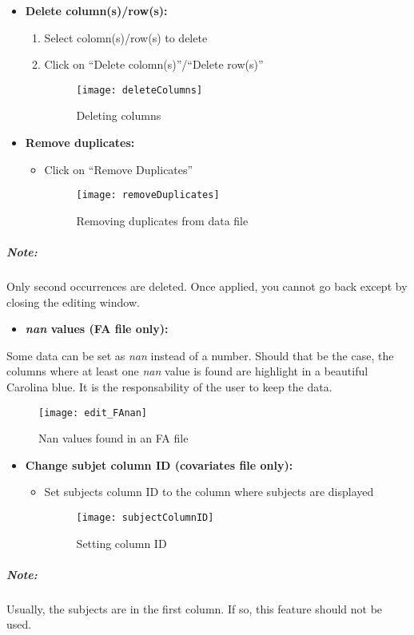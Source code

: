 \documentclass[fadttsterUserGuide_use]{subfiles}
\begin{document}
	\begin{itemize}
		\item \textbf{Delete column(s)/row(s):}
		\begin{enumerate}
			\item Select colomn(s)/row(s) to delete
			\item Click on ``Delete colomn(s)''/``Delete row(s)''
			\begin{figure}[H]
  				\texttt{[image: deleteColumns]}
  				\caption{Deleting columns}
    			\label{fig:editionWindow_deleteColumnsRows}
			\end{figure}
		\end{enumerate}
	\end{itemize}
	\begin{itemize}
		\item \textbf{Remove duplicates:}
		\begin{itemize}
			\item Click on ``Remove Duplicates''
			\begin{figure}[H]
  				\texttt{[image: removeDuplicates]}
  				\caption{Removing duplicates from data file}
    			\label{fig:editionWindow_removeDuplicates}
			\end{figure}
		\end{itemize}
	\end{itemize}
	\subparagraph{\textbf{Note:}} Only second occurrences are deleted. Once applied, you cannot go back except by closing the editing window.
	\vfill
	\newpage
	
	\begin{itemize}
		\item \textbf{\textit{nan} values (FA file only):}
	\end{itemize}
		Some data can be set as \textit{nan} instead of a number. Should that be the case, the columns where at least one \textit{nan} value is found are highlight in a beautiful Carolina blue. It is the responsability of the user to keep the data.
	\begin{figure}[H]
  		\texttt{[image: edit\_FAnan]}
  		\caption{Nan values found in an FA file}
    	\label{fig:editionWindow_nanValues}
	\end{figure}
	\begin{itemize}
		\item \textbf{Change subjet column ID (covariates file only):}
		\begin{itemize}
			\item Set subjects column ID to the column where subjects are displayed
			\begin{figure}[H]
  				\texttt{[image: subjectColumnID]}
  				\caption{Setting column ID}
    			\label{fig:editionWindow_setColumnID}
			\end{figure}
		\end{itemize}
	\end{itemize}
	\subparagraph{\textbf{Note:}} Usually, the subjects are in the first column. If so, this feature should not be used.	
	\vfill
	\newpage
	
\end{document}
